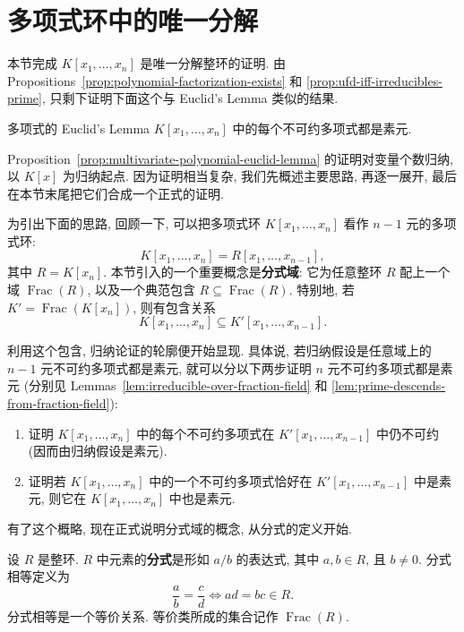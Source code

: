 \section{多项式环中的唯一分解}\label{sec:unique-factorization-polynomial-rings}

本节完成 $K[x_{1},\ldots,x_{n}]$ 是唯一分解整环的证明. 由 Propositions~\ref{prop:polynomial-factorization-exists} 和 \ref{prop:ufd-iff-irreducibles-prime}, 只剩下证明下面这个与 Euclid's Lemma 类似的结果.

\begin{Proposition}{多项式的 Euclid's Lemma}\label{prop:multivariate-polynomial-euclid-lemma}
  $K[x_{1},\ldots,x_{n}]$ 中的每个不可约多项式都是素元.
\end{Proposition}

Proposition~\ref{prop:multivariate-polynomial-euclid-lemma} 的证明对变量个数归纳, 以 $K[x]$ 为归纳起点. 因为证明相当复杂, 我们先概述主要思路, 再逐一展开, 最后在本节末尾把它们合成一个正式的证明.

为引出下面的思路, 回顾一下, 可以把多项式环 $K[x_{1},\ldots,x_{n}]$ 看作 $n-1$ 元的多项式环:
\[
  K[x_{1},\ldots,x_{n}]=R[x_{1},\ldots,x_{n-1}],
\]
其中 $R=K[x_{n}]$. 本节引入的一个重要概念是\textbf{分式域}: 它为任意整环 $R$ 配上一个域 $\operatorname{Frac}(R)$, 以及一个典范包含 $R\subseteq\operatorname{Frac}(R)$. 特别地, 若 $K'=\operatorname{Frac}(K[x_{n}])$, 则有包含关系
\[
  K[x_{1},\ldots,x_{n}]\subseteq K'[x_{1},\ldots,x_{n-1}].
\]

利用这个包含, 归纳论证的轮廓便开始显现. 具体说, 若归纳假设是任意域上的 $n-1$ 元不可约多项式都是素元, 就可以分以下两步证明 $n$ 元不可约多项式都是素元 (分别见 Lemmas~\ref{lem:irreducible-over-fraction-field} 和 \ref{lem:prime-descends-from-fraction-field}):
\begin{enumerate}[label=\arabic*.]
  \item 证明 $K[x_{1},\ldots,x_{n}]$ 中的每个不可约多项式在 $K'[x_{1},\ldots,x_{n-1}]$ 中仍不可约 (因而由归纳假设是素元).
  \item 证明若 $K[x_{1},\ldots,x_{n}]$ 中的一个不可约多项式恰好在 $K'[x_{1},\ldots,x_{n-1}]$ 中是素元, 则它在 $K[x_{1},\ldots,x_{n}]$ 中也是素元.
\end{enumerate}
有了这个概略, 现在正式说明分式域的概念, 从分式的定义开始.

\begin{BookPropositionDefinition}[分式]\label{def:fraction-equivalence}
  设 $R$ 是整环. $R$ 中元素的\textbf{分式}是形如 $a/b$ 的表达式, 其中 $a,b\in R$, 且 $b\ne0$. 分式相等定义为
  \[
    \frac{a}{b}=\frac{c}{d}\iff ad=bc\in R.
  \]
  分式相等是一个等价关系. 等价类所成的集合记作 $\operatorname{Frac}(R)$.
\end{BookPropositionDefinition}

